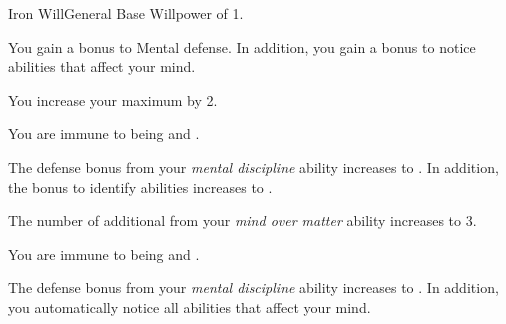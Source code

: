     \begin{feat}{Iron Will}{General}
        \featpre Base Willpower of 1.

         You gain a  bonus to Mental defense.
        In addition, you gain a  bonus to notice  abilities that affect your mind.

         You increase your maximum  by 2.

         You are immune to being  and .

         The defense bonus from your \textit{mental discipline} ability increases to .
        In addition, the bonus to identify  abilities increases to .

         The number of additional  from your \textit{mind over matter} ability increases to 3.

         You are immune to being  and .

         The defense bonus from your \textit{mental discipline} ability increases to .
        In addition, you automatically notice all  abilities that affect your mind.
    \end{feat}

